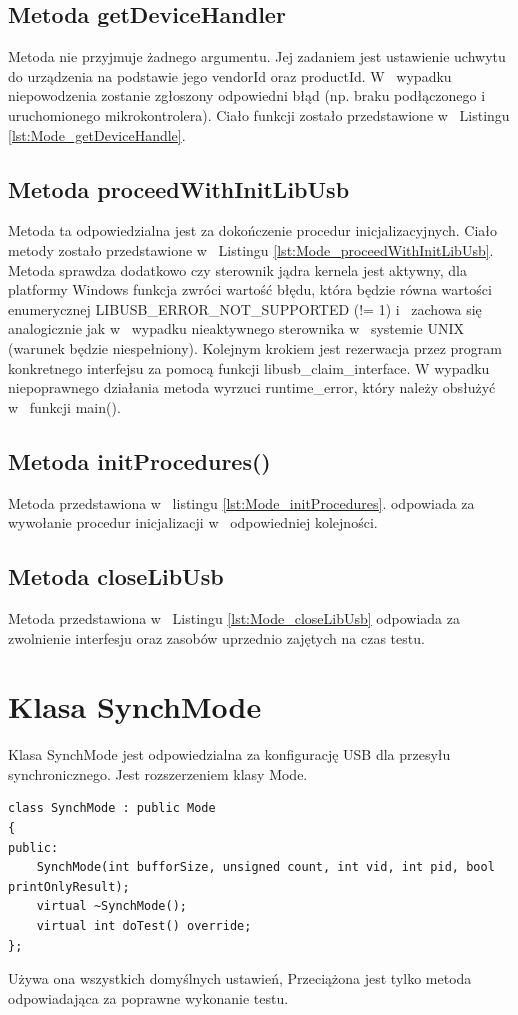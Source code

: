 \documentclass{BscUS}
\begin{document}
\subsection{Metoda getDeviceHandler}
Metoda nie przyjmuje żadnego argumentu. Jej zadaniem jest ustawienie uchwytu do urządzenia na podstawie jego vendorId oraz productId. W~ wypadku niepowodzenia zostanie zgłoszony odpowiedni błąd (np. braku podłączonego i~ uruchomionego mikrokontrolera).
Ciało funkcji zostało przedstawione w~ Listingu \ref{lst:Mode_getDeviceHandle}.
\subsection{Metoda proceedWithInitLibUsb}
Metoda ta odpowiedzialna jest za dokończenie procedur inicjalizacyjnych. Ciało metody zostało przedstawione w~ Listingu \ref{lst:Mode_proceedWithInitLibUsb}. Metoda sprawdza dodatkowo czy sterownik jądra kernela jest aktywny, dla platformy Windows funkcja zwróci wartość błędu, która będzie równa wartości enumerycznej LIBUSB\_ERROR\_NOT\_SUPPORTED (!= 1) i~ zachowa się analogicznie jak w~ wypadku nieaktywnego sterownika w~ systemie UNIX (warunek będzie niespełniony).
Kolejnym krokiem jest rezerwacja przez program konkretnego interfejsu za pomocą funkcji libusb\_claim\_interface.
W wypadku niepoprawnego działania metoda wyrzuci runtime\_error, który należy obsłużyć  w~ funkcji main().


\subsection{Metoda initProcedures()}
Metoda przedstawiona w~ listingu \ref{lst:Mode_initProcedures}. odpowiada za wywołanie procedur inicjalizacji w~ odpowiedniej kolejności.
\subsection{Metoda closeLibUsb}
Metoda przedstawiona w~ Listingu \ref{lst:Mode_closeLibUsb} odpowiada za zwolnienie interfesju oraz zasobów uprzednio zajętych na czas testu.

\section{Klasa SynchMode}
Klasa SynchMode jest odpowiedzialna za konfigurację USB dla przesyłu synchronicznego. Jest rozszerzeniem klasy Mode.
\begin{lstlisting}[caption={Deklaracja klasy SynchMode.},label={lst:CSynchMode}]
class SynchMode : public Mode
{
public:
	SynchMode(int bufforSize, unsigned count, int vid, int pid, bool printOnlyResult);
	virtual ~SynchMode();
	virtual int doTest() override;
};
\end{lstlisting}
Używa ona wszystkich domyślnych ustawień, Przeciążona jest tylko metoda odpowiadająca za poprawne wykonanie testu.
\end{document}
